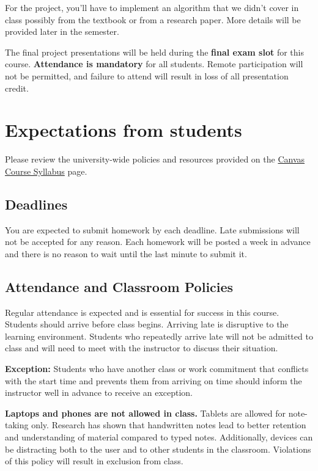 \documentclass{article}
\newcommand{\sectionbreak}{\newpage}
\begin{document}
For the project, you'll have to implement an algorithm that we didn't cover in class possibly from the textbook or from a research paper. More details will be provided later in the semester.

The final project presentations will be held during the \textbf{final exam slot} for this course. \textbf{Attendance is mandatory} for all students. Remote participation will not be permitted, and failure to attend will result in loss of all presentation credit.

\sectionbreak
\section{Expectations from students}

Please review the university-wide policies and resources provided on the \href{https://jhu.instructure.com/courses/119377/external_tools/14137}{Canvas Course Syllabus} page.

\subsection{Deadlines}

You are expected to submit homework by each deadline. Late submissions will not be accepted for any reason. Each homework will be posted a week in advance and there is no reason to wait until the last minute to submit it.

\subsection{Attendance and Classroom Policies}

Regular attendance is expected and is essential for success in this course. Students should arrive before class begins. Arriving late is disruptive to the learning environment. Students who repeatedly arrive late will not be admitted to class and will need to meet with the instructor to discuss their situation.

\textbf{Exception:} Students who have another class or work commitment that conflicts with the start time and prevents them from arriving on time should inform the instructor well in advance to receive an exception. 

\textbf{Laptops and phones are not allowed in class.} Tablets are allowed for note-taking only. Research has shown that handwritten notes lead to better retention and understanding of material compared to typed notes. Additionally, devices can be distracting both to the user and to other students in the classroom. Violations of this policy will result in exclusion from class. 
\end{document}
